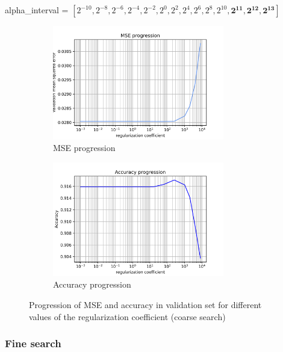 \documentclass[a4paper]{article}    %
\begin{document}
\begin{center}
    alpha\_interval = $[2^{-10}, 2^{-8}, 2^{-6}, 2^{-4}, 2^{-2}, 2^{0}, 2^{2}, 2^{4}, 2^{6}, 2^{8}, 2^{10}, \boldsymbol{2^{11}, 2^{12}, 2^{13}}]$
\end{center}

\begin{figure}[H]
    \centering
    \begin{subfigure}{0.48\textwidth}
        \centering
        \includegraphics[width=7.5cm]{alpha_MSE_coarse_search}
        \caption{MSE progression}
        \label{fig:alpha-coarse-mse}
    \end{subfigure}
    \hfill
    \begin{subfigure}{0.48\textwidth}
        \centering
        \includegraphics[width=7.5cm]{alpha_ACCURACY_coarse_search}
        \caption{Accuracy progression}
        \label{fig:alpha-coarse-acc}
    \end{subfigure}
    \hfill
    \caption{Progression of MSE and accuracy in validation set for different values of the regularization coefficient (coarse search)}
    \label{fig:alpha_coarse}
\end{figure}

\subsubsection{Fine search}
\end{document}
